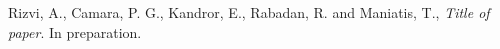 \documentclass[letterpaper,10pt,english]{/usr/share/sphinx/texinputs/sphinxhowto}
\begin{document}
        

        \renewcommand{\indexname}{Index}
        \printindex

    \begin{thebibliography}{99}
     Rizvi, A., Camara, P. G., Kandror, E., Rabadan, R. and Maniatis, T., \emph{Title of paper}. In preparation.
    \end{thebibliography}
    
\end{document}
